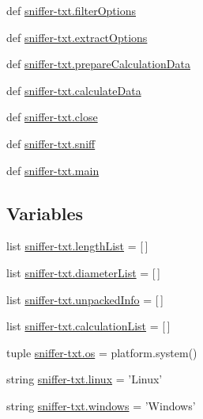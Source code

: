 \begin{DoxyCompactItemize}
def \hyperlink{namespacesniffer-txt_a754a77b8d2212971bf2212b2a68d09a7}{sniffer-\/txt.\-filter\-Options}
\item 
def \hyperlink{namespacesniffer-txt_ab055d964bd7b072f723e37f8640ede67}{sniffer-\/txt.\-extract\-Options}
\item 
def \hyperlink{namespacesniffer-txt_ab5ee7a0f51c57d0a61d81f19150500b4}{sniffer-\/txt.\-prepare\-Calculation\-Data}
\item 
def \hyperlink{namespacesniffer-txt_ab0710996df2779d7bd89d74f012fbf3e}{sniffer-\/txt.\-calculate\-Data}
\item 
def \hyperlink{namespacesniffer-txt_a319a12cf872c33386afaa841104b95a5}{sniffer-\/txt.\-close}
\item 
def \hyperlink{namespacesniffer-txt_abde57596973903c0f1d1d1eb4ae3702f}{sniffer-\/txt.\-sniff}
\item 
def \hyperlink{namespacesniffer-txt_af1d54736a91422620b1d875de09e1e40}{sniffer-\/txt.\-main}
\end{DoxyCompactItemize}
\subsection*{Variables}
\begin{DoxyCompactItemize}
\item 
list \hyperlink{namespacesniffer-txt_af2801b4a4b86144b8120299fce8780e2}{sniffer-\/txt.\-length\-List} = \mbox{[}$\,$\mbox{]}
\item 
list \hyperlink{namespacesniffer-txt_ae65c5aad5af62d9d9a2a1c5a58ec3a9a}{sniffer-\/txt.\-diameter\-List} = \mbox{[}$\,$\mbox{]}
\item 
list \hyperlink{namespacesniffer-txt_a84149e7306f19b4944485099936a239f}{sniffer-\/txt.\-unpacked\-Info} = \mbox{[}$\,$\mbox{]}
\item 
list \hyperlink{namespacesniffer-txt_ab67272f005323340d63822df02ccd4ee}{sniffer-\/txt.\-calculation\-List} = \mbox{[}$\,$\mbox{]}
\item 
tuple \hyperlink{namespacesniffer-txt_a5db6a4e5a19872fc540ccb12df84454b}{sniffer-\/txt.\-os} = platform.\-system()
\item 
string \hyperlink{namespacesniffer-txt_acbec0cd98fae6d51a9a78d453d6ba6ca}{sniffer-\/txt.\-linux} = 'Linux'
\item 
string \hyperlink{namespacesniffer-txt_a82b6fe97a9763e8f2fc014cd51e5aaee}{sniffer-\/txt.\-windows} = 'Windows'
\end{DoxyCompactItemize}
